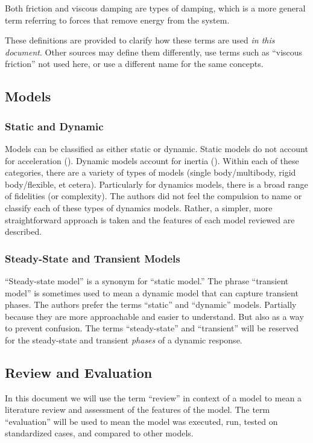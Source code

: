 Both friction and viscous damping are types of damping, which is a more general term referring to forces that remove energy from the system.

These definitions are provided to clarify how these terms are used \emph{in this document}.  Other sources may define them differently, use terms such as ``viscous friction'' not used here, or use a different name for the same concepts.

\subsection{Models}
\subsubsection{Static and Dynamic}
Models can be classified as either static or dynamic.  Static models do not account for acceleration (\staticforcebalance{}).  Dynamic models account for inertia (\dynamicforcebalance{}).  Within each of these categories, there are a variety of types of models (single body/multibody, rigid body/flexible, et cetera).  Particularly for dynamics models, there is a broad range of fidelities (or complexity).  The authors did not feel the compulsion to name or classify each of these types of dynamics models.  Rather, a simpler, more straightforward approach is taken and the features of each model reviewed are described.

\subsubsection{Steady-State and Transient Models}
``Steady-state model'' is a synonym for ``static model.'' The phrase ``transient model'' is sometimes used to mean a dynamic model that can capture transient phases.  The authors prefer the terms ``static'' and ``dynamic'' models.  Partially because they are more approachable and easier to understand.  But also as a way to prevent confusion.  The terms ``steady-state'' and ``transient'' will be reserved for the steady-state and transient \emph{phases} of a dynamic response.

\subsection{Review and Evaluation}
In this document we will use the term ``review'' in context of a model to mean a literature review and assessment of the features of the model.  The term ``evaluation'' will be used to mean the model was executed, run, tested on standardized cases, and compared to other models.

